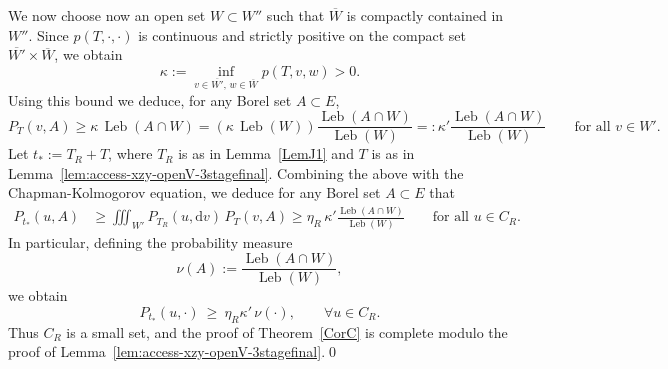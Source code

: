 \documentclass[11pt, a4paper,leqno]{amsart}
\theoremstyle{definition}
\numberwithin{equation}{section}
\begin{document}
We now choose now an open set \(W\subset W''\) such that
\(\overline{W}\) is compactly contained in \(W''\).
Since \(p(T,\cdot,\cdot)\) is continuous and strictly positive on the compact
set \(\overline{W'}\times \overline{W}\), we obtain
\[
\kappa :=
\inf_{v\in\overline{W'},\, w\in\overline{W}} p(T,v,w)
>0 .
\]
Using this bound we deduce, for any Borel set \(A\subset E\),
\[
P_T(v,A)
\ge
\kappa\,\operatorname{Leb}(A\cap W)
=
(\kappa\,\operatorname{Leb}(W))
\frac{\operatorname{Leb}(A\cap W)}{\operatorname{Leb}(W)}
=: \kappa'
\frac{\operatorname{Leb}(A\cap W)}{\operatorname{Leb}(W)}
\qquad
\text{for all } v\in W'.
\]
Let \(t_\ast:=T_R+T\), where \(T_R\) is as in Lemma~\ref{LemJ1} and \(T\) is
as in Lemma~\ref{lem:access-xzy-openV-3stagefinal}. Combining the above with
the Chapman-Kolmogorov equation, we deduce for any Borel set \(A\subset E\)
that
\begin{align}\label{eq:local-minor-++a}
P_{t_\ast}(u,A)
&\ge
\iiint_{W'} P_{T_R}(u,\mathrm{d}v)\,P_T(v,A)\ge
\eta_R\,\kappa'
\frac{\operatorname{Leb}(A\cap W)}{\operatorname{Leb}(W)}
\qquad
\text{for all } u\in C_R .
\end{align}
In particular, defining the probability measure
\[
\nu(A):=
\frac{\operatorname{Leb}(A\cap W)}{\operatorname{Leb}(W)},
\]
we obtain
\begin{equation}\label{eq:minor-far-style}
P_{t_\ast}(u,\cdot)
\ \ge\
\eta_R\kappa'\,\nu(\cdot),
\qquad \forall u\in C_R .
\end{equation}
Thus \(C_R\) is a small set, and the proof of Theorem~\ref{CorC} is complete
modulo the proof of Lemma~\ref{lem:access-xzy-openV-3stagefinal}.\qed
\end{document}
